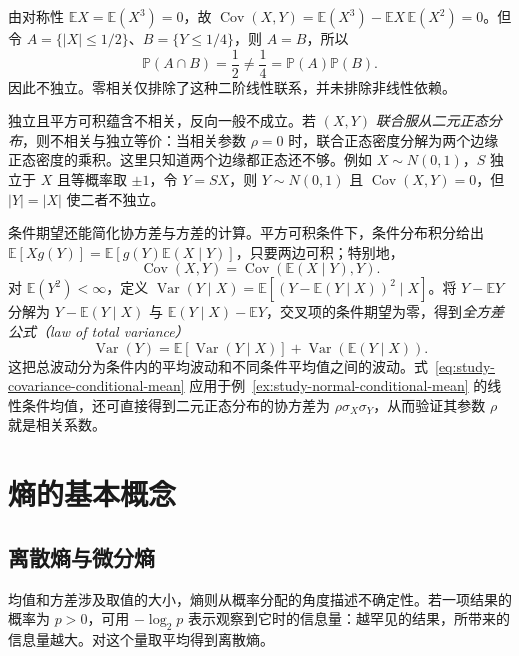 \begin{solve}
由对称性 $\mathbb E X=\mathbb E(X^3)=0$，故 $\operatorname{Cov}(X,Y)=\mathbb E(X^3)-\mathbb E X\,\mathbb E(X^2)=0$。但令 $A=\{|X|\le1/2\}$、$B=\{Y\le1/4\}$，则 $A=B$，所以
\[
  \mathbb P(A\cap B)=\frac12\ne\frac14=\mathbb P(A)\mathbb P(B).
\]
因此不独立。零相关仅排除了这种二阶线性联系，并未排除非线性依赖。
\end{solve}

独立且平方可积蕴含不相关，反向一般不成立。若 $(X,Y)$ \emph{联合服从二元正态分布}，则不相关与独立等价：当相关参数 $\rho=0$ 时，联合正态密度分解为两个边缘正态密度的乘积。这里只知道两个边缘都正态还不够。例如 $X\sim N(0,1)$，$S$ 独立于 $X$ 且等概率取 $\pm1$，令 $Y=SX$，则 $Y\sim N(0,1)$ 且 $\operatorname{Cov}(X,Y)=0$，但 $|Y|=|X|$ 使二者不独立。

条件期望还能简化协方差与方差的计算。平方可积条件下，条件分布积分给出 $\mathbb E[Xg(Y)]=\mathbb E[g(Y)\mathbb E(X\mid Y)]$，只要两边可积；特别地，
\begin{equation}
  \operatorname{Cov}(X,Y)=\operatorname{Cov}(\mathbb E(X\mid Y),Y).
  \label{eq:study-covariance-conditional-mean}
\end{equation}
对 $\mathbb E(Y^2)<\infty$，定义 $\operatorname{Var}(Y\mid X)=\mathbb E[(Y-\mathbb E(Y\mid X))^2\mid X]$。将 $Y-\mathbb E Y$ 分解为 $Y-\mathbb E(Y\mid X)$ 与 $\mathbb E(Y\mid X)-\mathbb E Y$，交叉项的条件期望为零，得到\emph{全方差公式（law of total variance）}
\begin{equation}
  \operatorname{Var}(Y)=\mathbb E[\operatorname{Var}(Y\mid X)]
    +\operatorname{Var}(\mathbb E(Y\mid X)).
  \label{eq:study-total-variance}
\end{equation}
这把总波动分为条件内的平均波动和不同条件平均值之间的波动。式~\eqref{eq:study-covariance-conditional-mean} 应用于例~\ref{ex:study-normal-conditional-mean} 的线性条件均值，还可直接得到二元正态分布的协方差为 $\rho\sigma_X\sigma_Y$，从而验证其参数 $\rho$ 就是相关系数。

\section{熵的基本概念}
\label{sec:study-entropy}

\subsection{离散熵与微分熵}
\label{subsec:study-entropy-definitions}

均值和方差涉及取值的大小，熵则从概率分配的角度描述不确定性。若一项结果的概率为 $p>0$，可用 $-\log_2p$ 表示观察到它时的信息量：越罕见的结果，所带来的信息量越大。对这个量取平均得到离散熵。

